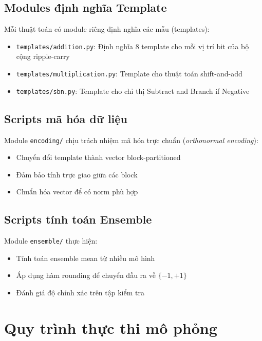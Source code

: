 \subsection{Modules định nghĩa Template}

Mỗi thuật toán có module riêng định nghĩa các mẫu (templates):

\begin{itemize}
    \item \texttt{templates/addition.py}: Định nghĩa 8 template cho mỗi vị trí bit của bộ cộng ripple-carry
    \item \texttt{templates/multiplication.py}: Template cho thuật toán shift-and-add
    \item \texttt{templates/sbn.py}: Template cho chỉ thị Subtract and Branch if Negative
\end{itemize}

\subsection{Scripts mã hóa dữ liệu}

Module \texttt{encoding/} chịu trách nhiệm mã hóa trực chuẩn (\textit{orthonormal encoding}):
\begin{itemize}
    \item Chuyển đổi template thành vector block-partitioned
    \item Đảm bảo tính trực giao giữa các block
    \item Chuẩn hóa vector để có norm phù hợp
\end{itemize}

\subsection{Scripts tính toán Ensemble}

Module \texttt{ensemble/} thực hiện:
\begin{itemize}
    \item Tính toán ensemble mean từ nhiều mô hình
    \item Áp dụng hàm rounding để chuyển đầu ra về $\{-1, +1\}$
    \item Đánh giá độ chính xác trên tập kiểm tra
\end{itemize}

\section{Quy trình thực thi mô phỏng}

